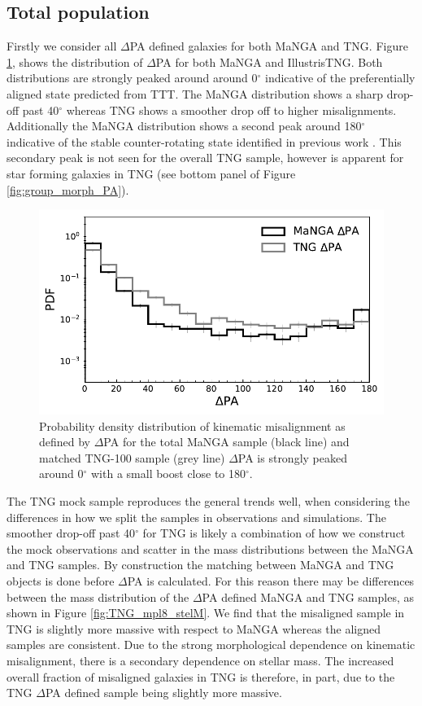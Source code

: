 \documentclass[fleqn,usenatbib]{mnras}
\begin{document}
\subsection{Total population} \label{sec:manga_total_pop}
Firstly we consider all $\Delta$PA defined galaxies for both MaNGA and TNG. Figure \ref{fig:total_pa_dist}, shows the distribution of $\Delta$PA for both MaNGA and IllustrisTNG. Both distributions are strongly peaked around around 0$^{\circ}$ indicative of the preferentially aligned state predicted from TTT. The MaNGA distribution shows a sharp drop-off past 40$^{\circ}$ whereas TNG shows a smoother drop off to higher misalignments. Additionally the MaNGA distribution shows a second peak around 180$^{\circ}$ indicative of the stable counter-rotating state identified in previous work \citep[e.g.][]{chen2016}. This secondary peak is not seen for the overall TNG sample, however is apparent for star forming galaxies in TNG (see bottom panel of Figure \ref{fig:group_morph_PA}). 

\begin{figure}
	\includegraphics[width=\linewidth]{total_pop/mpl8_pa_dist.pdf}
    \caption{Probability density distribution of kinematic misalignment as defined by $\Delta$PA for the total MaNGA sample (black line) and matched TNG-100 sample (grey line)  $\Delta$PA is strongly peaked around 0$^{\circ}$ with a small boost close to 180$^{\circ}$.}
    \label{fig:total_pa_dist}
\end{figure}

The TNG mock sample reproduces the general trends well, when considering the differences in how we split the samples in observations and simulations. The smoother drop-off past 40$^{\circ}$ for TNG is likely a combination of how we construct the mock observations and scatter in the mass distributions between the MaNGA and TNG samples. By construction the matching between MaNGA and TNG objects is done before $\Delta$PA is calculated. For this reason there may be differences between the mass distribution of the $\Delta$PA defined MaNGA and TNG samples, as shown in Figure \ref{fig:TNG_mpl8_stelM}. We find that the misaligned sample in TNG is slightly more massive with respect to MaNGA whereas the aligned samples are consistent. Due to the strong morphological dependence on kinematic misalignment, there is a secondary dependence on stellar mass. The increased overall fraction of misaligned galaxies in TNG is therefore, in part, due to the TNG $\Delta$PA defined sample being slightly more massive.
\end{document}
